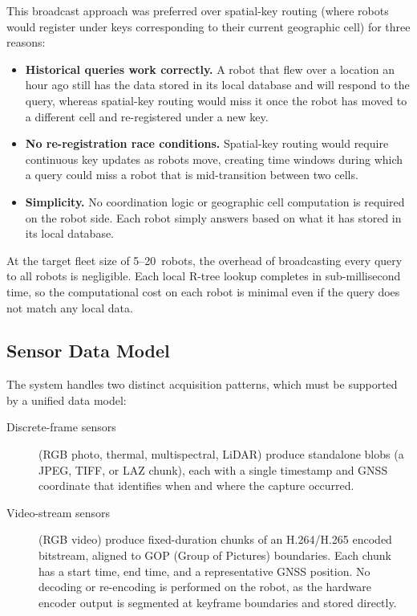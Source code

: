 This broadcast approach was preferred over spatial-key routing (where robots would register under keys corresponding to their current geographic cell) for three reasons:
\begin{itemize}
    \item \textbf{Historical queries work correctly.} A robot that flew over a location an hour ago still has the data stored in its local database and will respond to the query, whereas spatial-key routing would miss it once the robot has moved to a different cell and re-registered under a new key.
    \item \textbf{No re-registration race conditions.} Spatial-key routing would require continuous key updates as robots move, creating time windows during which a query could miss a robot that is mid-transition between two cells.
    \item \textbf{Simplicity.} No coordination logic or geographic cell computation is required on the robot side. Each robot simply answers based on what it has stored in its local database.
\end{itemize}

At the target fleet size of 5--20~robots, the overhead of broadcasting every query to all robots is negligible. Each local R-tree lookup completes in sub-millisecond time, so the computational cost on each robot is minimal even if the query does not match any local data.


\subsection{Sensor Data Model} \label{subsec:sensor-data-model}

The system handles two distinct acquisition patterns, which must be supported by a unified data model:

\begin{description}
    \item[Discrete-frame sensors] (RGB photo, thermal, multispectral, LiDAR) produce standalone blobs (a JPEG, TIFF, or LAZ chunk), each with a single timestamp and GNSS coordinate that identifies when and where the capture occurred.
    \item[Video-stream sensors] (RGB video) produce fixed-duration chunks of an H.264/H.265 encoded bitstream, aligned to GOP (Group of Pictures) boundaries. Each chunk has a start time, end time, and a representative GNSS position. No decoding or re-encoding is performed on the robot, as the hardware encoder output is segmented at keyframe boundaries and stored directly.
\end{description}


